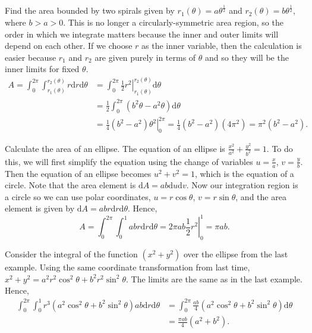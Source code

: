 \documentclass[../multivariate_calculus.tex]{subfiles}
\begin{document}
        \begin{example}
            Find the area bounded by two spirals given by $r_1(\theta)=a\theta^\frac{1}{2}$ and $r_2(\theta)=b\theta^\frac{1}{2}$, where $b>a>0$.
            This is no longer a circularly-symmetric area region, so the order in which we integrate matters because the inner and outer limits will depend on each other.
            If we choose $r$ as the inner variable, then the calculation is easier because $r_1$ and $r_2$ are given purely in terms of $\theta$ and so they will be the inner limits for fixed $\theta$.
            \begin{align}
                A=\int_0^{2\pi}\int_{r_1(\theta)}^{r_2(\theta)}r\mathrm{d}r\mathrm{d}\theta&=\int_0^{2\pi}\left.\frac{1}{2}r^2\right|_{r_1(\theta)}^{r_2(\theta)}\mathrm{d}\theta\\
                &=\frac{1}{2}\int_0^{2\pi}(b^2\theta-a^2\theta)\mathrm{d}\theta\\
                &=\left.\frac{1}{4}(b^2-a^2)\theta^2\right|_0^{2\pi}=\frac{1}{4}(b^2-a^2)(4\pi^2)=\pi^2(b^2-a^2).
            \end{align}
        \end{example}
        \begin{example}
            Calculate the area of an ellipse.
            The equation of an ellipse is $\frac{x^2}{a^2}+\frac{y^2}{b^2}=1$.
            To do this, we will first simplify the equation using the change of variables $u=\frac{x}{a}$, $v=\frac{y}{b}$.
            Then the equation of an ellipse becomes $u^2+v^2=1$, which is the equation of a circle.
            Note that the area element is $\mathrm{d}A=ab\mathrm{d}u\mathrm{d}v$.
            Now our integration region is a circle so we can use polar coordinates, $u=r\cos\theta$, $v=r\sin\theta$, and the area element is given by $\mathrm{d}A=abr\mathrm{d}r\mathrm{d}\theta$.
            Hence,
            \begin{equation}
                A=\int_0^{2\pi}\int_0^1 abr\mathrm{d}r\mathrm{d}\theta=\left.2\pi ab\frac{1}{2}r^2\right|_0^1=\pi ab.
            \end{equation}
        \end{example}
        \begin{example}
            Consider the integral of the function $(x^2+y^2)$ over the ellipse from the last example.
            Using the same coordinate transformation from last time, $x^2+y^2=a^2r^2\cos^2\theta+b^2r^2\sin^2\theta$.
            The limits are the same as in the last example.
            Hence,
            \begin{align}
                \int_0^{2\pi}\int_0^1 r^3(a^2\cos^2\theta+b^2\sin^2\theta)ab\mathrm{d}r\mathrm{d}\theta&=\int_0^{2\pi}\frac{ab}{4}(a^2\cos^2\theta+b^2\sin^2\theta)\mathrm{d}\theta\\
                &=\frac{\pi ab}{4}(a^2+b^2).
            \end{align}
        \end{example}
\end{document}
